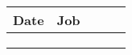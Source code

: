 \begin{table}[]
\begin{tabular}{|l|l|l|l|l|}
\hline
Date & Job &  &  &  \\ \hline
     &     &  &  &  \\ \hline
     &     &  &  &  \\ \hline
     &     &  &  &  \\ \hline
\end{tabular}
\end{table}


